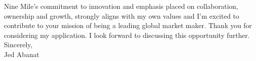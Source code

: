 Nine Mile's commitment to innovation and emphasis placed on collaboration, ownership and growth, strongly aligns with my own values and I'm excited to contribute to your mission of being a leading global market maker. Thank you for considering my application. I look forward to discussing this opportunity further. \\

Sincerely,\\
Jed Abanat